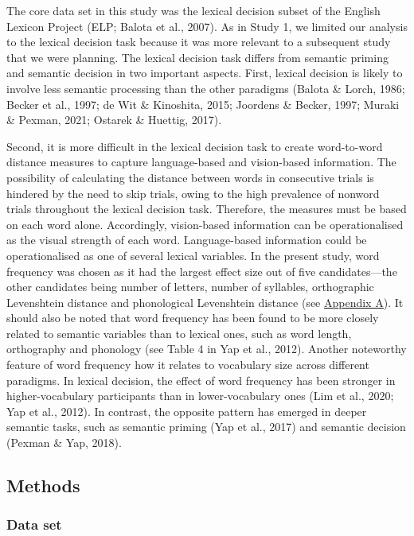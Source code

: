 \documentclass[
  12pt,
  man,floatsintext]{apa7}
\begin{document}
The core data set in this study was the lexical decision subset of the English Lexicon Project (ELP; Balota et al., 2007). As in Study 1, we limited our analysis to the lexical decision task because it was more relevant to a subsequent study that we were planning. The lexical decision task differs from semantic priming and semantic decision in two important aspects. First, lexical decision is likely to involve less semantic processing than the other paradigms (Balota \& Lorch, 1986; Becker et al., 1997; de Wit \& Kinoshita, 2015; Joordens \& Becker, 1997; Muraki \& Pexman, 2021; Ostarek \& Huettig, 2017).

Second, it is more difficult in the lexical decision task to create word-to-word distance measures to capture language-based and vision-based information. The possibility of calculating the distance between words in consecutive trials is hindered by the need to skip trials, owing to the high prevalence of nonword trials throughout the lexical decision task. Therefore, the measures must be based on each word alone. Accordingly, vision-based information can be operationalised as the visual strength of each word. Language-based information could be operationalised as one of several lexical variables. In the present study, word frequency was chosen as it had the largest effect size out of five candidates---the other candidates being number of letters, number of syllables, orthographic Levenshtein distance and phonological Levenshtein distance (see \protect\hyperlink{appendix-A-lexical-covariates}{\underline{Appendix A}}). It should also be noted that word frequency has been found to be more closely related to semantic variables than to lexical ones, such as word length, orthography and phonology (see Table 4 in Yap et al., 2012). Another noteworthy feature of word frequency how it relates to vocabulary size across different paradigms. In lexical decision, the effect of word frequency has been stronger in higher-vocabulary participants than in lower-vocabulary ones (Lim et al., 2020; Yap et al., 2012). In contrast, the opposite pattern has emerged in deeper semantic tasks, such as semantic priming (Yap et al., 2017) and semantic decision (Pexman \& Yap, 2018).

\hypertarget{methods-2}{%
\subsection{Methods}\label{methods-2}}

\hypertarget{data-set-1}{%
\subsubsection{Data set}\label{data-set-1}}
\end{document}
